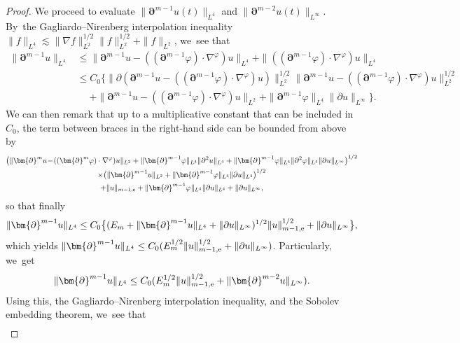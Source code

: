 \begin{proof}
We proceed to evaluate $\|\bm{\partial}^{m-1}u(t)\|_{L^4}$ and $\|\bm{\partial}^{m-2}u(t)\|_{L^\infty}$. By~the Gagliardo--Nirenberg interpolation inequality $\|f\|_{L^4} \lesssim \|\nabla f\|_{L^2}^{1/2}\|f\|_{L^2}^{1/2} + \|f\|_{L^2}$, we~see that
\begin{align*}
\|\bm{\partial}^{m-1} u\|_{L^4}
&\leq \|\bm{\partial}^{m-1} u - ((\bm{\partial}^{m-1}\varphi)\cdot\nabla^\varphi)u\|_{L^4}
+ \|((\bm{\partial}^{m-1}\varphi)\cdot\nabla^\varphi)u\|_{L^4} \\
&\leq C_0 \bigl\{ \|\partial(\bm{\partial}^{m-1} u \! -\! ((\bm{\partial}^{m-1}\varphi)\cdot\nabla^\varphi)u)\|_{L^2}^{1/2}
\|\bm{\partial}^{m-1} u \!-\! ((\bm{\partial}^{m-1}\varphi)\cdot\nabla^\varphi)u\|_{L^2}^{1/2} \\
&\quad\;
+ \|\bm{\partial}^{m-1} u - ((\bm{\partial}^{m-1}\varphi)\cdot\nabla^\varphi)u\|_{L^2}
+ \|\bm{\partial}^{m-1}\varphi\|_{L^4} \|\partial u\|_{L^\infty} \bigr\} .
\end{align*}
We can then remark that up to a multiplicative constant that can be included in $C_0$, the term between braces in the right-hand side can be bounded from above by
\begin{multline*}
\bigl(\|\bm{\partial}^{m} u \!-\! ((\bm{\partial}^{m}\varphi)\cdot\nabla^\varphi)u\|_{L^2}
+ \|\bm{\partial}^{m-1}\varphi\|_{L^4} \|\partial^2u\|_{L^4}
+ \|\bm{\partial}^{m-1}\varphi\|_{L^4} \|\partial^2\varphi\|_{L^4} \|\partial u\|_{L^\infty} \bigr)^{1/2} \\
\times\bigl(\|\bm{\partial}^{m-1}u\|_{L^2} + \|\bm{\partial}^{m-1}\varphi\|_{L^4} \|\partial u\|_{L^4} \bigr)^{1/2} \\
+ \|u\|_{m-1,{\rm e}} + \|\bm{\partial}^{m-1}\varphi\|_{L^4} \|\partial u\|_{L^4} + \|\partial u\|_{L^\infty},
\end{multline*}
so that finally
\[
\|\bm{\partial}^{m-1} u\|_{L^4}
\leq C_0 \bigl\{ (E_m+\|\bm{\partial}^{m-1} u\|_{L^4}+\|\partial u\|_{L^\infty})^{1/2} \|u\|_{m-1,{\rm e}}^{1/2} + \|\partial u\|_{L^\infty} \bigr\},
\]
which yields $\|\bm{\partial}^{m-1} u\|_{L^4} \leq C_0 (E_m^{1/2}\|u\|_{m-1,{\rm e}}^{1/2} + \|\partial u\|_{L^\infty})$.
Particularly, we~get
\begin{equation}\label{CalIneq1}
\|\bm{\partial}^{m-1} u\|_{L^4} \leq C_0 (E_m^{1/2} \|u\|_{m-1,{\rm e}}^{1/2} + \|\bm{\partial}^{m-2} u\|_{L^\infty}).
\end{equation}
Using this, the Gagliardo--Nirenberg interpolation inequality, and the Sobolev embedding theorem, we~see that
\begin{align*}

\end{align*}
\end{proof}
